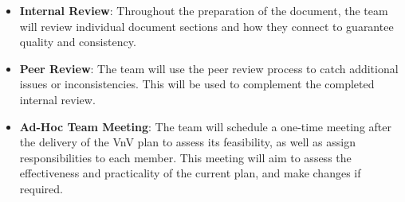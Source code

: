 \documentclass[12pt, titlepage]{article}
\begin{document}
\begin{itemize}
  \item \textbf{Internal Review}: Throughout the preparation of the document, the team will review individual document sections and how they connect to guarantee quality and consistency.
  \item \textbf{Peer Review}: The team will use the peer review process to catch additional issues or inconsistencies. This will be used to complement the completed internal review.
  \item \textbf{Ad-Hoc Team Meeting}: The team will schedule a one-time meeting after the delivery of the VnV plan to assess its feasibility, as well as assign responsibilities to each member.
  This meeting will aim to assess the effectiveness and practicality of the current plan, and make changes if required.
\end{itemize}
\end{document}
